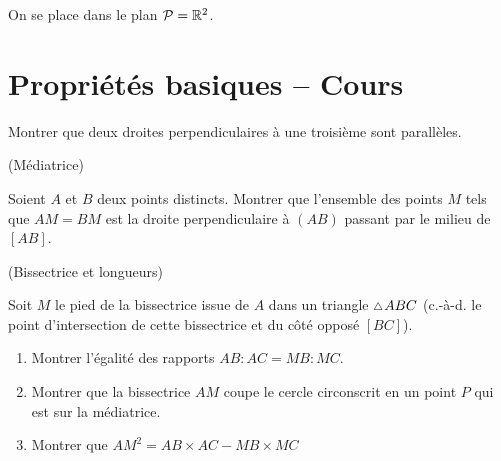 \documentclass[a4paper,11pt,reqno]{amsart}
\begin{document}

\begin{convention}
  On se place dans le plan $\mathcal{P}=\mathbb{R}^2$.
\end{convention}

\section{Propriétés basiques -- Cours}


\begin{exo}[.5]

  Montrer que deux droites perpendiculaires à une troisième sont parallèles.
\end{exo}

\begin{exo}[.7] (Médiatrice)

  Soient $A$ et $B$ deux points distincts. Montrer que l'ensemble des points $M$ tels que $AM=BM$ est la droite perpendiculaire à $(AB)$ passant par le milieu de $[AB]$.
\end{exo}

\begin{exo} (Bissectrice et longueurs)

  Soit $M$ le pied de la bissectrice issue de $A$ dans un triangle $\tri ABC$ (c.-à-d. le point d'intersection de cette bissectrice et du côté opposé $[BC]$).
  \begin{enumerate}
    \item Montrer l'égalité des rapports $AB:AC=MB:MC$.
    \item Montrer que la bissectrice $AM$ coupe le cercle circonscrit en un point $P$ qui est sur la médiatrice.
    \item Montrer que $AM^{2} = AB \times AC - MB \times MC$
  \end{enumerate}
\end{exo}
\end{document}
